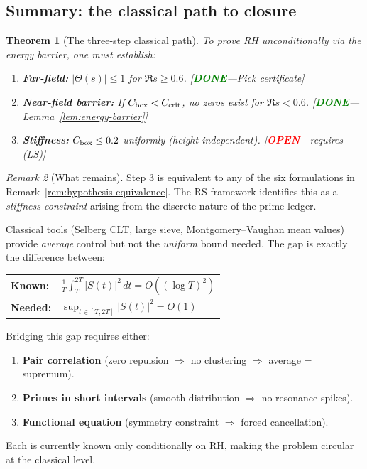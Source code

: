 \documentclass[11pt]{article}
\newtheorem{theorem}{Theorem}
\theoremstyle{definition}
\theoremstyle{remark}
\newtheorem{remark}[theorem]{Remark}
\theoremstyle{definition}
\begin{document}
\subsection*{Summary: the classical path to closure}\label{sec:classical-summary}

\begin{theorem}[The three-step classical path]\label{thm:three-step}
To prove RH unconditionally via the energy barrier, one must establish:
\begin{enumerate}
\item \textbf{Far-field:} $|\Theta(s)| \le 1$ for $\Re s \ge 0.6$. \hfill [\textcolor{green}{\textbf{DONE}}---Pick certificate]
\item \textbf{Near-field barrier:} If $C_{\rm box} < C_{\rm crit}$, no zeros exist for $\Re s < 0.6$. \hfill [\textcolor{green}{\textbf{DONE}}---Lemma~\ref{lem:energy-barrier}]
\item \textbf{Stiffness:} $C_{\rm box} \le 0.2$ uniformly (height-independent). \hfill [\textcolor{red}{\textbf{OPEN}}---requires (LS)]
\end{enumerate}
\end{theorem}

\begin{remark}[What remains]
Step 3 is equivalent to any of the six formulations in Remark~\ref{rem:hypothesis-equivalence}. The RS framework identifies this as a \emph{stiffness constraint} arising from the discrete nature of the prime ledger.

Classical tools (Selberg CLT, large sieve, Montgomery--Vaughan mean values) provide \emph{average} control but not the \emph{uniform} bound needed. The gap is exactly the difference between:
\begin{center}
\begin{tabular}{ll}
\textbf{Known:} & $\displaystyle\frac{1}{T}\int_T^{2T} |S(t)|^2\,dt = O((\log T)^2)$ \\[6pt]
\textbf{Needed:} & $\displaystyle\sup_{t \in [T,2T]} |S(t)|^2 = O(1)$
\end{tabular}
\end{center}

Bridging this gap requires either:
\begin{enumerate}
\item \textbf{Pair correlation} (zero repulsion $\Rightarrow$ no clustering $\Rightarrow$ average = supremum).
\item \textbf{Primes in short intervals} (smooth distribution $\Rightarrow$ no resonance spikes).
\item \textbf{Functional equation} (symmetry constraint $\Rightarrow$ forced cancellation).
\end{enumerate}
Each is currently known only conditionally on RH, making the problem circular at the classical level.
\end{remark}
\end{document}
